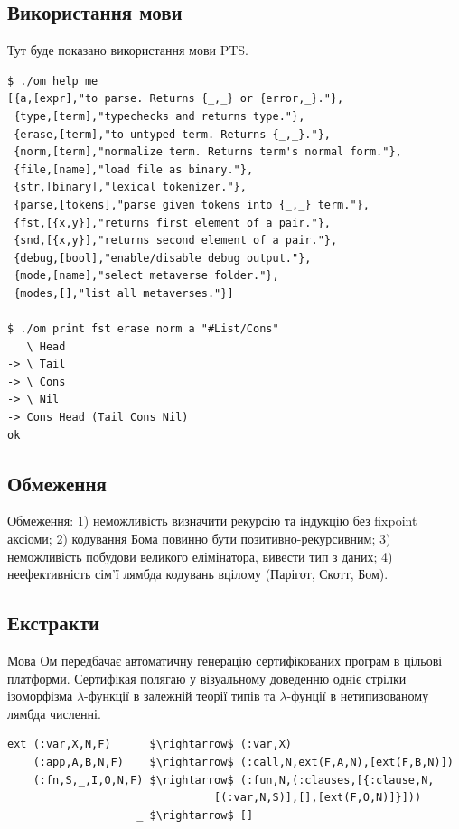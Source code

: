 \subsection{Використання мови}
Тут буде показано використання мови PTS.

\begin{lstlisting}
$ ./om help me
[{a,[expr],"to parse. Returns {_,_} or {error,_}."},
 {type,[term],"typechecks and returns type."},
 {erase,[term],"to untyped term. Returns {_,_}."},
 {norm,[term],"normalize term. Returns term's normal form."},
 {file,[name],"load file as binary."},
 {str,[binary],"lexical tokenizer."},
 {parse,[tokens],"parse given tokens into {_,_} term."},
 {fst,[{x,y}],"returns first element of a pair."},
 {snd,[{x,y}],"returns second element of a pair."},
 {debug,[bool],"enable/disable debug output."},
 {mode,[name],"select metaverse folder."},
 {modes,[],"list all metaverses."}]

$ ./om print fst erase norm a "#List/Cons"
   \ Head
-> \ Tail
-> \ Cons
-> \ Nil
-> Cons Head (Tail Cons Nil)
ok
\end{lstlisting}

\subsection{Обмеження}

Обмеження:
1) неможливість визначити рекурсію та індукцію без fixpoint аксіоми;
2) кодування Бома повинно бути позитивно-рекурсивним;
3) неможливість побудови великого елімінатора, вивести тип з даних;
4) неефективність сім'ї лямбда кодувань вцілому (Парігот, Скотт, Бом).

\subsection{Екстракти}

Мова Ом передбачає автоматичну генерацію сертифікованих програм в цільові платформи.
Сертифікая полягаю у візуальному доведенню одніє стрілки ізоморфізма
$\lambda$-функції в залежній теорії типів та $\lambda$-фунції в нетипизованому лямбда численні.

\begin{lstlisting}[mathescape=true]
ext (:var,X,N,F)      $\rightarrow$ (:var,X)
    (:app,A,B,N,F)    $\rightarrow$ (:call,N,ext(F,A,N),[ext(F,B,N)])
    (:fn,S,_,I,O,N,F) $\rightarrow$ (:fun,N,(:clauses,[{:clause,N,
                                [(:var,N,S)],[],[ext(F,O,N)]}]))
                    _ $\rightarrow$ []
\end{lstlisting}

